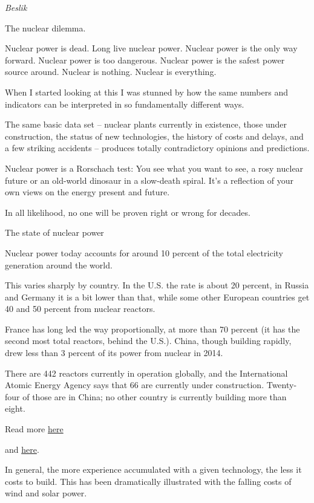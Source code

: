 \documentclass[
]{book}
\begin{document}
\emph{Beslik}

The nuclear dilemma.

Nuclear power is dead. Long live nuclear power. Nuclear power is the only way forward. Nuclear power is too dangerous. Nuclear power is the safest power source around. Nuclear is nothing. Nuclear is everything.

When I started looking at this I was stunned by how the same numbers and indicators can be interpreted in so fundamentally different ways.

The same basic data set -- nuclear plants currently in existence, those under construction, the status of new technologies, the history of costs and delays, and a few striking accidents -- produces totally contradictory opinions and predictions.

Nuclear power is a Rorschach test: You see what you want to see, a rosy nuclear future or an old-world dinosaur in a slow-death spiral. It's a reflection of your own views on the energy present and future.

In all likelihood, no one will be proven right or wrong for decades.

The state of nuclear power

Nuclear power today accounts for around 10 percent of the total electricity generation around the world.

This varies sharply by country. In the U.S. the rate is about 20 percent, in Russia and Germany it is a bit lower than that, while some other European countries get 40 and 50 percent from nuclear reactors.

France has long led the way proportionally, at more than 70 percent (it has the second most total reactors, behind the U.S.). China, though building rapidly, drew less than 3 percent of its power from nuclear in 2014.

There are 442 reactors currently in operation globally, and the International Atomic Energy Agency says that 66 are currently under construction. Twenty-four of those are in China; no other country is currently building more than eight.

Read more \href{https://world-nuclear.org/information-library/current-and-future-generation/nuclear-power-in-the-world-today.aspx}{here}

and \href{https://world-nuclear.org/information-library/nuclear-fuel-cycle/introduction/nuclear-fuel-cycle-overview.aspx}{here}.

In general, the more experience accumulated with a given technology, the less it costs to build. This has been dramatically illustrated with the falling costs of wind and solar power.
\end{document}
